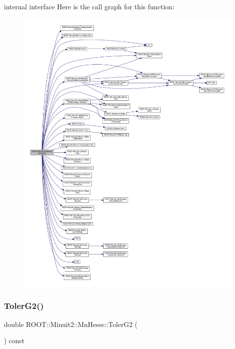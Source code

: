 internal interface Here is the call graph for this function\+:\nopagebreak
\begin{figure}[H]
\begin{center}
\leavevmode
\includegraphics[width=350pt]{d1/d02/classROOT_1_1Minuit2_1_1MnHesse_a4130de0190695811a4606f8ab229482d_cgraph}
\end{center}
\end{figure}
\mbox{\label{classROOT_1_1Minuit2_1_1MnHesse_ae625b94360c1c974854b63aedbcc6a1a}} 
\subsubsection{\texorpdfstring{TolerG2()}{TolerG2()}\hspace{0.1cm}{\footnotesize\ttfamily [1/2]}}
{\footnotesize\ttfamily double R\+O\+O\+T\+::\+Minuit2\+::\+Mn\+Hesse\+::\+Toler\+G2 (\begin{DoxyParamCaption}{ }\end{DoxyParamCaption}) const\hspace{0.3cm}{\ttfamily [inline]}}

